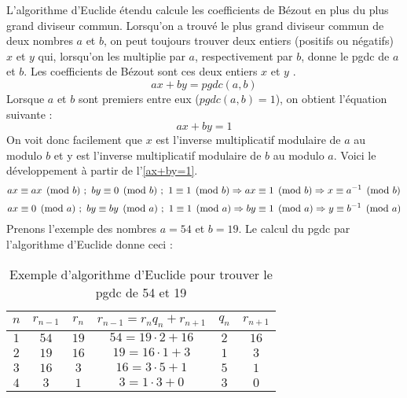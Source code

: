 \documentclass[10pt,a4paper,twoside]{article}
\numberwithin{equation}{section}
\begin{document}
				L'algorithme d'Euclide étendu calcule les coefficients de Bézout en plus du plus grand diviseur commun. Lorsqu'on a trouvé le plus grand diviseur commun de deux nombres $a$ et $b$, on peut toujours trouver deux entiers (positifs ou négatifs) $x$ et $y$ qui, lorsqu'on les multiplie par $a$, respectivement par $b$, donne le pgdc de $a$ et $b$. Les coefficients de Bézout sont ces deux entiers $x$ et $y$ \cite{wiki_algorithme_euclide_etendu}.
				\begin{equation}
					ax + by = pgdc(a,b)
				\end{equation}
				Lorsque $a$ et $b$ sont premiers entre eux ($pgdc(a,b) = 1$), on obtient l'équation suivante :
				\begin{equation}\label{ax+by=1}
					ax + by = 1
				\end{equation}
				On voit donc facilement que $x$ est l'inverse multiplicatif modulaire de $a$ au modulo $b$ et y est l'inverse multiplicatif modulaire de $b$ au modulo $a$. Voici le développement à partir de l'\autoref{ax+by=1}.
				\begin{equation}
					ax \equiv ax \pmod b\ ;\ by \equiv 0 \pmod b\ ;\ 1 \equiv 1 \pmod b \\					
					\Rightarrow ax \equiv 1 \pmod b \Rightarrow x \equiv a^{-1} \pmod b
				\end{equation}
				 \begin{equation}
				 	ax \equiv 0 \pmod a\ ;\ by \equiv by \pmod a\ ;\ 1 \equiv 1 \pmod a \\
				 	\Rightarrow by \equiv 1 \pmod a \Rightarrow y \equiv b^{-1} \pmod a
				 \end{equation}
				 Prenons l'exemple des nombres $a = 54$ et $b = 19$. Le calcul du pgdc par l'algorithme d'Euclide donne ceci : 
				 \begin{table}[H]
				 	\centering
				 	\begin{tabular}{|c|c|c|c|c|c|}
				 		\hline
				 		\rowcolor{gray!40} $n$ & $r_{n-1}$ & $r_n$ & $r_{n-1} = r_nq_n + r_{n+1}$ & $q_n$ & $r_{n+1}$\\
				 		\hline
				 		$1$ & $54$ & $19$ & $54 = 19 \cdot 2 + 16$ & $2$ & $16$ \\
				 		\hline
				 		$2$ & $19$ & $16$ & $19 = 16 \cdot 1 + 3$ & $1$ & $3$ \\
				 		\hline
				 		$3$ & $16$ & $3$ & $16 = 3 \cdot 5 + 1$ & $5$ & \cellcolor{yellow!40} $1$\\
				 		\hline
				 		$4$ & $3$ & $1$ & $3 = 1 \cdot 3 + 0$ & $3$ & $0$\\
				 		\hline
				 	\end{tabular}
				 	\caption{Exemple d'algorithme d'Euclide pour trouver le pgdc de 54 et 19} \label{example_pgdc2}
				 \end{table}
\end{document}
